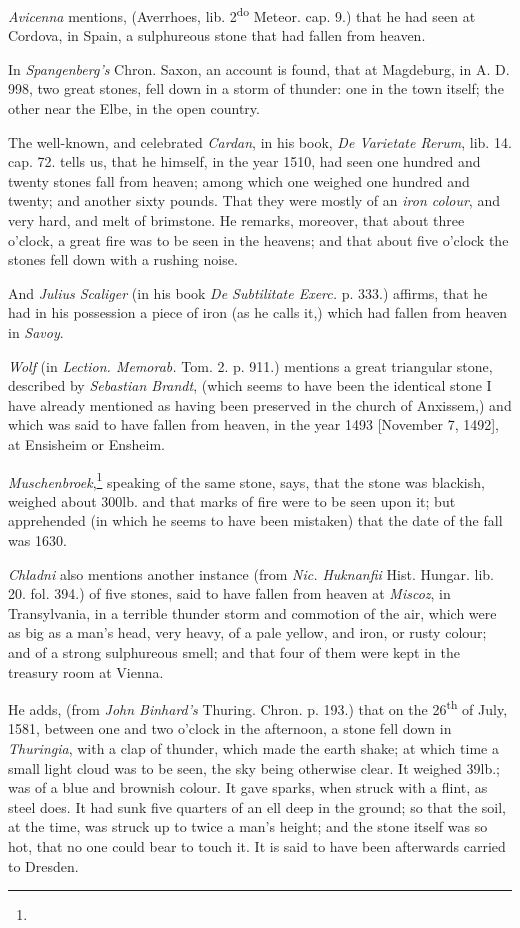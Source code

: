 \documentclass[a4paper, 12pt, oneside]{article}
\begin{document}
\emph{Avicenna} mentions, (Averrhoes, lib. 2\textsuperscript{do} Meteor. cap. 9.) that he had seen at Cordova, in Spain, a sulphureous stone that had fallen from heaven.

In \emph{Spangenberg's} Chron. Saxon, an account is found, that at Magdeburg, in A. D. 998, two great stones, fell down in a storm of thunder: one in the town itself; the other near the Elbe, in the open country.

The well-known, and celebrated \emph{Cardan}, in his book, \emph{De Varietate Rerum}, lib. 14. cap. 72. tells us, that he himself, in the year 1510, had seen one hundred and twenty stones fall from heaven; among which one weighed one hundred and twenty; and another sixty pounds. That they were mostly of an \emph{iron colour}, and very hard, and melt of brimstone. He remarks, moreover, that about three o'clock, a great fire was to be seen in the heavens; and that about five o'clock the stones fell down with a rushing noise.

And \emph{Julius Scaliger} (in his book \emph{De Subtilitate Exerc.} p. 333.) affirms, that he had in his possession a piece of iron (as he calls it,) which had fallen from heaven in \emph{Savoy}.

\emph{Wolf} (in \emph{Lection. Memorab.} Tom. 2. p. 911.) mentions a great triangular stone, described by \emph{Sebastian Brandt}, (which seems to have been the identical stone I have already mentioned as having been preserved in the church of Anxissem,) and which was said to have fallen from heaven, in the year 1493 [November 7, 1492], at Ensisheim or Ensheim.

\emph{Muschenbroek},\footnote{} speaking of the same stone, says, that the stone was blackish, weighed about 300lb. and that marks of fire were to be seen upon it; but apprehended (in which he seems to have been mistaken) that the date of the fall was 1630.

\emph{Chladni} also mentions another instance (from \emph{Nic. Huknanfii} Hist. Hungar. lib. 20. fol. 394.) of five stones, said to have fallen from heaven at \emph{Miscoz}, in Transylvania, in a terrible thunder storm and commotion of the air, which were as big as a man's head, very heavy, of a pale yellow, and iron, or rusty colour; and of a strong sulphureous smell; and that four of them were kept in the treasury room at Vienna.

He adds, (from \emph{John Binhard's} Thuring. Chron. p. 193.) that on the 26\textsuperscript{th} of July, 1581, between one and two o'clock in the afternoon, a stone fell down in \emph{Thuringia}, with a clap of thunder, which made the earth shake; at which time a small light cloud was to be seen, the sky being otherwise clear. It weighed 39lb.; was of a blue and brownish colour. It gave sparks, when struck with a flint, as steel does. It had sunk five quarters of an ell deep in the ground; so that the soil, at the time, was struck up to twice a man's height; and the stone itself was so hot, that no one could bear to touch it. It is said to have been afterwards carried to Dresden.
\end{document}
